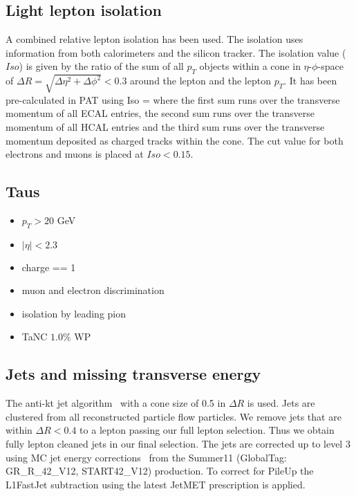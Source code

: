 \subsection{Light lepton isolation}\label{sec:isolation}

A combined relative lepton isolation has been used. The isolation uses information from both calorimeters and the silicon tracker. The isolation value ($Iso$) is given by the ratio of the sum of all $p_T$ objects within a cone in $\eta$-$\phi$-space of $\Delta R = \sqrt{\Delta \eta^2 + \Delta \phi^2 } < 0.3$ around the lepton and the lepton $p_T$. It has been pre-calculated in PAT using
\be
    Iso = 
\ee
where the first sum runs over the transverse momentum of all ECAL entries, the second sum runs over the transverse momentum of all HCAL entries and the third sum runs over the transverse momentum deposited as charged tracks within the cone. The cut value for both electrons and muons is placed at $Iso<0.15$.


\subsection{Taus}\label{sec:taus}

\begin{itemize}
\item $p_T > 20$ GeV
\item $|\eta| < 2.3$
\item charge == 1
\item muon and electron discrimination
\item isolation by leading pion
\item TaNC $1.0\%$ WP
\end{itemize}

\subsection{Jets and missing transverse energy}\label{sec:jet}

The anti-kt jet algorithm~\cite{antiKT} with a cone size of 0.5 in $\Delta R$ is used. 
Jets are clustered from all reconstructed particle flow particles.
We remove jets that are within $\Delta R < 0.4$ to a lepton passing our
full lepton selection. Thus we obtain fully lepton cleaned jets in our final selection.
The jets are corrected up to level 3 using MC jet energy corrections~\cite{mcjetcorrections}
from the Summer11 (GlobalTag: GR\_R\_42\_V12, START42\_V12) production. 
To correct for PileUp the L1FastJet subtraction using the latest JetMET
prescription is applied.

